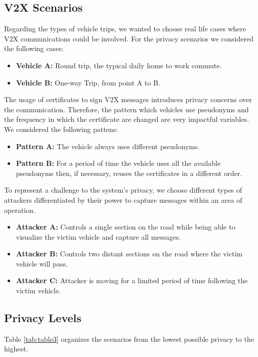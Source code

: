 		\subsection{V2X Scenarios}		
		Regarding the types of vehicle trips, we wanted to choose real life cases where V2X communications could be involved. For the privacy scenarios we considered the following cases:
		\begin{itemize}
			\item \textbf{Vehicle A:} Round trip, the typical daily home to work commute.
			\item \textbf{Vehicle B:} One-way Trip, from point A to B.
		\end{itemize}
		
		
		The usage of certificates to sign V2X messages introduces privacy concerns over the communication. Therefore, the pattern which vehicles use pseudonyms and the frequency in which the certificate are changed are very impactful variables. We considered the following pattens:
		\begin{itemize}
			\item \textbf{Pattern A:} The vehicle always uses different pseudonyms.
			\item \textbf{Pattern B:} For a period of time the vehicle uses all the available pseudonyms then, if necessary, reuses the certificates in a different order.
		\end{itemize}
		
		To represent a challenge to the system's privacy, we choose different types of attackers differentiated by their power to capture messages within an area of operation.
		\begin{itemize}
			\item \textbf{Attacker A:} Controls a single section on the road while being able to visualize the victim vehicle and capture all messages.
			\item \textbf{Attacker B:} Controls two distant sections on the road where the victim vehicle will pass.
			\item \textbf{Attacker C:} Attacker is moving for a limited period of time following the victim vehicle. 
		\end{itemize}
		
		
		
		\subsection{Privacy Levels}
		
		Table \ref{tab:table3} organizes the scenarios from the lowest possible privacy to the highest.
		
